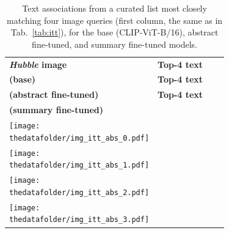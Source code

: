 \documentclass[10pt]{article} %
\newcommand{\hubble}{\emph{Hubble}\xspace}
\begin{document}
\begin{table}[t!]
  \centering
  \renewcommand{\arraystretch}{0.1}
  \begin{tabular}{m{3cm} m{3.9cm} m{3.9cm} m{3.9cm}}
      \toprule
      \centering \bfseries \hubble image & \centering \textbf{Top-4 text} \\ \textbf{\textcolor{deeppurple}{(base)}} & \centering  \textbf{Top-4 text} \\ \textbf{\textcolor{deepblue}{(abstract fine-tuned)}} & \centering  \textbf{Top-4 text} \\ \textbf{\textcolor{deepred}{(summary fine-tuned)}} \tabularnewline
      \midrule
      \centering \texttt{[image: \\thedatafolder/img\_itt\_abs\_0.pdf]} & \centering \scriptsize  & \centering  \scriptsize  &  {\scriptsize } \tabularnewline
      \midrule
      \centering \texttt{[image: \\thedatafolder/img\_itt\_abs\_1.pdf]} & \centering \scriptsize  & \centering  \scriptsize  &  {\scriptsize } \tabularnewline
      \midrule
      \centering \texttt{[image: \\thedatafolder/img\_itt\_abs\_2.pdf]} & \centering \scriptsize  & \centering  \scriptsize  &  {\scriptsize } \tabularnewline
      \midrule
      \centering \texttt{[image: \\thedatafolder/img\_itt\_abs\_3.pdf]} & \centering \scriptsize  & \centering  \scriptsize  &  {\scriptsize } \tabularnewline
      \bottomrule
  \end{tabular}
  \caption{Text associations from a curated list most closely matching four image queries (first column, the same as in Tab.~\ref{tab:itt}), for the \textcolor{deeppurple}{base} (CLIP-ViT-B/16), \textcolor{deepblue}{abstract fine-tuned}, and \textcolor{deepred}{summary fine-tuned} models.}
  \label{tab:itt_abs}
\end{table}
  
\end{document}
